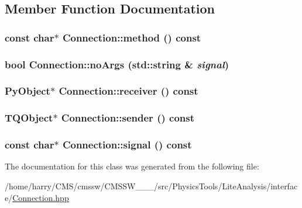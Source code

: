 \subsection{Member Function Documentation}
\hypertarget{classConnection_a6}{
\subsubsection[method]{\setlength{\rightskip}{0pt plus 5cm}const char$\ast$ Connection::method () const}}
\label{classConnection_a6}


\hypertarget{classConnection_a2}{
\subsubsection[noArgs]{\setlength{\rightskip}{0pt plus 5cm}bool Connection::no\-Args (std::string \& {\em signal})}}
\label{classConnection_a2}


\hypertarget{classConnection_a5}{
\subsubsection[receiver]{\setlength{\rightskip}{0pt plus 5cm}Py\-Object$\ast$ Connection::receiver () const}}
\label{classConnection_a5}


\hypertarget{classConnection_a3}{
\subsubsection[sender]{\setlength{\rightskip}{0pt plus 5cm}TQObject$\ast$ Connection::sender () const}}
\label{classConnection_a3}


\hypertarget{classConnection_a4}{
\subsubsection[signal]{\setlength{\rightskip}{0pt plus 5cm}const char$\ast$ Connection::signal () const}}
\label{classConnection_a4}




The documentation for this class was generated from the following file:\begin{CompactItemize}
\item 
/home/harry/CMS/cmssw/CMSSW\_\_\_/src/Physics\-Tools/Lite\-Analysis/interface/\hyperlink{Connection_8hpp}{Connection.hpp}\end{CompactItemize}
